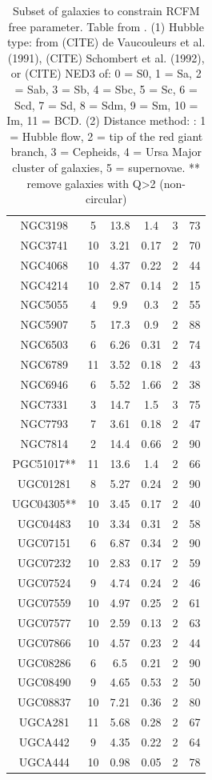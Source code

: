 \documentclass[reprint,%
 amsmath,amssymb,
 aps,
]{revtex4-1}
\begin{document}
\begin{table}[]
\begin{tabular}{|c|c|c|c|c|c|}
NGC3198& 	5& 	13.8& 	1.4&    	3& 	73\\
NGC3741& 	10& 	3.21& 	0.17& 	2& 	70\\
NGC4068& 	10& 	4.37& 	0.22& 	2& 	44\\
NGC4214& 	10& 	2.87& 	0.14& 	2& 	15\\
NGC5055& 	4& 	9.9& 	0.3&    	2& 	55\\
NGC5907& 	5& 	17.3& 	0.9&    	2& 	88\\
NGC6503& 	6& 	6.26& 	0.31&   	2& 	74\\
NGC6789& 	11& 	3.52& 	0.18& 	2& 	43\\
NGC6946& 	6& 	5.52& 	1.66&   	2& 	38\\
NGC7331& 	3& 	14.7& 	1.5&    	3& 	75\\
NGC7793& 	7& 	3.61& 	0.18&   	2& 	47\\
NGC7814& 	2&  	14.4& 	0.66& 	2& 	90\\
PGC51017**& 	11& 	13.6& 	1.4& 	2& 	66\\
UGC01281& 	8&   	5.27& 	0.24& 	2& 	90\\
UGC04305**& 	10& 	3.45& 	0.17& 	2& 	40\\
UGC04483& 	10& 	3.34& 	0.31& 	2& 	58\\
UGC07151& 	6& 	6.87& 	0.34&   	2& 	90\\
UGC07232& 	10& 	2.83& 	0.17& 	2& 	59\\
UGC07524& 	9& 	4.74& 	0.24& 	    2& 	46\\
UGC07559& 	10& 	4.97& 	0.25& 	2& 	61\\
UGC07577& 	10& 	2.59& 	0.13& 	2& 	63\\
UGC07866& 	10& 	4.57& 	0.23& 	2& 	44\\
UGC08286& 	6& 	6.5& 	0.21&   	2& 	90\\
UGC08490& 	9& 	4.65& 	0.53&   	2& 	50\\
UGC08837& 	10& 	7.21& 	0.36& 	2& 	80\\
UGCA281& 	11& 	5.68& 	0.28& 	2& 	67\\
UGCA442& 	9& 	4.35& 	0.22& 	    2& 	64\\
UGCA444& 	10& 	0.98& 	0.05& 	2& 	78\\
    \hline \hline           
      \end{tabular}
      \caption{Subset of galaxies to constrain RCFM free parameter.  Table from  \citet{2016Lelli}. 
      (1) Hubble type:  from (CITE) de
Vaucouleurs et al. (1991), (CITE) Schombert et al. (1992), or (CITE) NED3
of: 0 = S0, 1 = Sa, 2 = Sab,
3 = Sb, 4 = Sbc, 5 = Sc, 6 = Scd, 7 = Sd, 8 = Sdm,
9 = Sm, 10 = Im, 11 = BCD.  (2) Distance method: : 1 = Hubble flow,
2 = tip of the red giant branch, 3 = Cepheids, 4 = Ursa Major
cluster of galaxies, 5 = supernovae. ** remove galaxies with Q>2 (non-circular)}
   \label{tab:Tset}
  \end{table}
  
\end{document}
